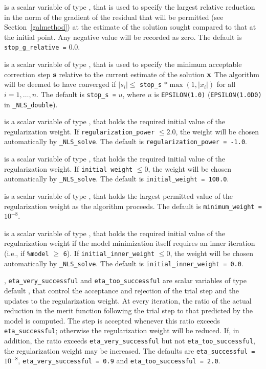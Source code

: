 \documentclass{galahad}
\newcommand{\packagename}{NLS}
\newcommand{\fullpackagename}{\libraryname\_\packagename}
\newcommand{\solver}{{\tt \fullpackagename\_solve}}
\begin{document}
\begin{description}
 is a scalar variable of type \realdp,
that is used to specify the largest relative reduction in the norm of the
gradient of the residual that will be permitted
(see Section~\ref{galmethod}) at the estimate of the solution sought
compared to that at the initial point.
Any negative value will be recorded as zero.
The default is {\tt stop\_g\_relative =} $0.0$.

 is a scalar variable of type \realdp,
that is used to specify the minimum acceptable correction step ${\mathbf{s}}$
relative to the current estimate of the solution ${\mathbf{x}}$
The algorithm will be deemed to have converged if $|s_i| \leq$
{\tt stop\_s} $\ast \max( 1, |x_i|)$ for all $i = 1, \ldots, n$.
The default is {\tt stop\_s =} $u$,
where $u$ is {\tt EPSILON(1.0)} ({\tt EPSILON(1.0D0)} in
{\tt \fullpackagename\_double}).

 is a scalar variable of type \realdp,
that holds the required initial value of the regularization weight. If
{\tt regularization\_power} $\leq 2.0$, the weight will be chosen automatically
by \solver.
The default is {\tt regularization\_power = -1.0}.

 is a scalar variable of type \realdp, that holds
the required initial value of the regularization weight. If
{\tt initial\_weight} $\leq 0$, the weight will be chosen automatically
by \solver.
The default is {\tt initial\_weight = 100.0}.

 is a scalar variable of type \realdp, that holds
the largest permitted value of the regularization weight as the algorithm
proceeds.
The default is {\tt minimum\_weight =} $10^{-8}$.

 is a scalar variable of type \realdp,
that holds the required initial value of the regularization weight if
the model minimization itself requires an inner iteration
(i.e., if {\tt \%model} $\geq$ {\tt 6}).
If {\tt initial\_inner\_weight} $\leq 0$, the weight will be chosen
automatically by \solver.
The default is {\tt initial\_inner\_weight = 0.0}.

, {\tt eta\_very\_successful}
and {\tt eta\_too\_successful}
are scalar variables of type default
\realdp, that control the acceptance and rejection of the trial step
and the updates to the regularization weight.
At every iteration, the ratio of the actual reduction in the merit function
following the trial step to that predicted by the model is computed.
The step is accepted whenever this ratio exceeds {\tt eta\_successful};
otherwise the regularization weight will be reduced.
If, in addition, the ratio exceeds {\tt eta\_very\_successful} but not
{\tt eta\_too\_successful}, the regularization weight may be increased.
The defaults are
{\tt eta\_successful =} $10^{-8}$,
{\tt eta\_very\_successful = 0.9} and
{\tt eta\_too\_successful = 2.0}.


\end{description}
\end{document}
